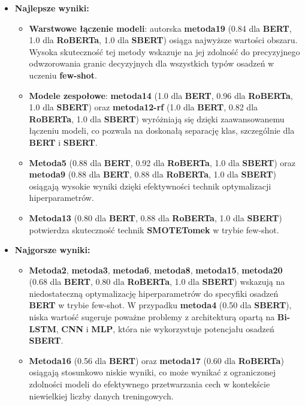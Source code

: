 \begin{itemize}
	\item \textbf{Najlepsze wyniki:}
	      \begin{itemize}
		      \item \textbf{Warstwowe łączenie modeli}: autorska \textbf{metoda19} (0.84 dla \textbf{BERT}, 1.0 dla \textbf{RoBERTa}, 1.0 dla \textbf{SBERT}) osiąga najwyższe wartości obszaru. Wysoka skuteczność tej metody wskazuje na jej zdolność do precyzyjnego odwzorowania granic decyzyjnych dla wszystkich typów osadzeń w uczeniu \textbf{few-shot}.
		      \item \textbf{Modele zespołowe}: \textbf{metoda14} (1.0 dla \textbf{BERT}, 0.96 dla \textbf{RoBERTa}, 1.0 dla \textbf{SBERT}) oraz \textbf{metoda12-rf} (1.0 dla \textbf{BERT}, 0.82 dla \textbf{RoBERTa}, 1.0 dla \textbf{SBERT}) wyróżniają się dzięki zaawansowanemu łączeniu modeli, co pozwala na doskonałą separację klas, szczególnie dla \textbf{BERT} i \textbf{SBERT}.
		      \item \textbf{Metoda5} (0.88 dla \textbf{BERT}, 0.92 dla \textbf{RoBERTa}, 1.0 dla \textbf{SBERT}) oraz \textbf{metoda9} (0.88 dla \textbf{BERT}, 0.88 dla \textbf{RoBERTa}, 1.0 dla \textbf{SBERT}) osiągają wysokie wyniki dzięki efektywności technik optymalizacji hiperparametrów.
		      \item \textbf{Metoda13} (0.80 dla \textbf{BERT}, 0.88 dla \textbf{RoBERTa}, 1.0 dla \textbf{SBERT}) potwierdza skuteczność technik \textbf{SMOTETomek} w trybie few-shot.
	      \end{itemize}
	\item \textbf{Najgorsze wyniki:}
	      \begin{itemize}
		      \item \textbf{Metoda2}, \textbf{metoda3}, \textbf{metoda6}, \textbf{metoda8}, \textbf{metoda15}, \textbf{metoda20} (0.68 dla \textbf{BERT}, 0.80 dla \textbf{RoBERTa}, 1.0 dla \textbf{SBERT}) wskazują na niedostateczną optymalizację hiperparametrów do specyfiki osadzeń \textbf{BERT} w trybie few-shot. W przypadku \textbf{metoda4} (0.50 dla \textbf{SBERT}), niska wartość sugeruje poważne problemy z architekturą opartą na \textbf{Bi-LSTM}, \textbf{CNN} i \textbf{MLP}, która nie wykorzystuje potencjału osadzeń \textbf{SBERT}.
		      \item \textbf{Metoda16} (0.56 dla \textbf{BERT}) oraz \textbf{metoda17} (0.60 dla \textbf{RoBERTa}) osiągają stosunkowo niskie wyniki, co może wynikać z ograniczonej zdolności modeli do efektywnego przetwarzania cech w kontekście niewielkiej liczby danych treningowych.
	      \end{itemize}
\end{itemize}

